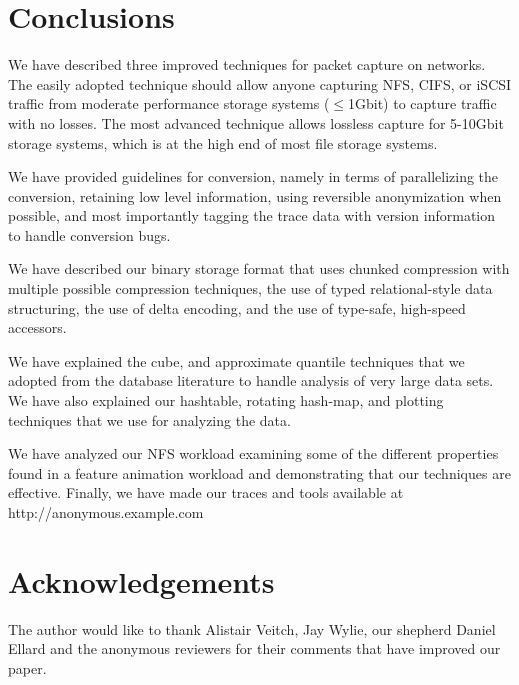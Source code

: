 \section{Conclusions}
\label{sec:conclusion}

We have described three improved techniques for packet capture on
networks.  The easily adopted technique should allow anyone capturing
NFS, CIFS, or iSCSI traffic from moderate performance storage systems
($\leq$1Gbit) to capture traffic with no losses.  The most advanced
technique allows lossless capture for 5-10Gbit storage systems, which
is at the high end of most file storage systems. 

We have provided guidelines for conversion, namely in terms of
parallelizing the conversion, retaining low level information, using
reversible anonymization when possible, and most importantly tagging
the trace data with version information to handle conversion bugs.

We have described our binary storage format that uses chunked
compression with multiple possible compression techniques, the use of
typed relational-style data structuring, the use of delta encoding,
and the use of type-safe, high-speed accessors.

We have explained the cube, and approximate quantile techniques that
we adopted from the database literature to handle analysis of very
large data sets.  We have also explained our hashtable, rotating
hash-map, and plotting techniques that we use for analyzing the data.

We have analyzed our NFS workload examining some of the different
properties found in a feature animation workload and demonstrating
that our techniques are effective.  Finally, we have made our traces
and tools available at http://anonymous.example.com

\section{Acknowledgements}

The author would like to thank Alistair Veitch, Jay Wylie, our
shepherd Daniel Ellard and the anonymous reviewers for their comments
that have improved our paper.
